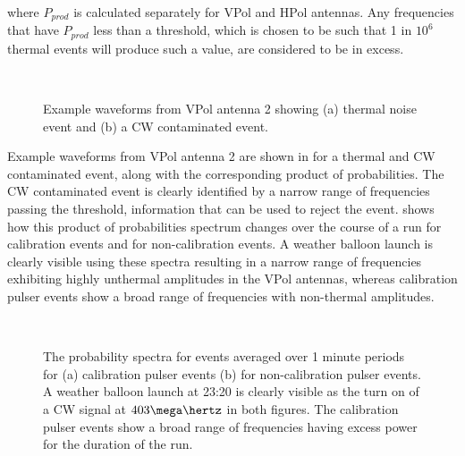 \noindent where $P_{prod}$ is calculated separately for VPol and HPol antennas. Any frequencies that have $P_{prod}$ less than a threshold, which is chosen to be such that 1 in $10^{6}$ thermal events will produce such a value, are considered to be in excess. 


\begin{figure}[htpb]
  \hfill
  \\
  \hfill
  \caption{Example waveforms from VPol antenna 2 showing (a) thermal noise event and (b) a CW contaminated event.}
  \label{fig:analysis:CWRemoval:Baselines:Waveforms}
\end{figure}

Example waveforms from VPol antenna 2 are shown in  for a thermal and CW contaminated event, along with the corresponding product of probabilities. The CW contaminated event is clearly identified by a narrow range of frequencies passing the threshold, information that can be used to reject the event.  shows how this product of probabilities spectrum changes over the course of a run for calibration events and for non-calibration events. A weather balloon launch is clearly visible using these spectra resulting in a narrow range of frequencies exhibiting highly unthermal amplitudes in the VPol antennas, whereas calibration pulser events show a broad range of frequencies with non-thermal amplitudes. 


\begin{figure}[htpb]
  \hfill
  \\
  \hfill
  \caption{The probability spectra for events averaged over 1 minute periods for (a) calibration pulser events (b) for non-calibration pulser events. A weather balloon launch at 23:20 is clearly visible as the turn on of a CW signal at $403 \mega \hertz$ in both figures. The calibration pulser events show a broad range of frequencies having excess power for the duration of the run.}
  \label{fig:analysis:CWRemoval:Filtering:CW-Time}
\end{figure}


